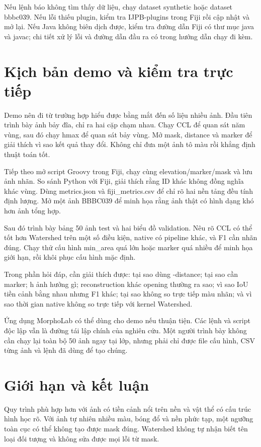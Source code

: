 \documentclass[12pt,a4paper,oneside]{report}
\begin{document}
Nếu lệnh báo không tìm thấy dữ liệu, chạy dataset synthetic hoặc dataset bbbc039. Nếu lỗi thiếu plugin, kiểm tra IJPB-plugins trong Fiji rồi cập nhật và mở lại. Nếu Java không biên dịch được, kiểm tra đường dẫn Fiji có thư mục java và javac; chi tiết xử lý lỗi và đường dẫn đầu ra có trong hướng dẫn chạy đi kèm.

\section{Kịch bản demo và kiểm tra trực tiếp}
Demo nên đi từ trường hợp hiểu được bằng mắt đến số liệu nhiều ảnh. Đầu tiên trình bày ảnh bảy đĩa, chỉ ra hai cặp chạm nhau. Chạy CCL để quan sát năm vùng, sau đó chạy hmax để quan sát bảy vùng. Mở mask, distance và marker để giải thích vì sao kết quả thay đổi. Không chỉ đưa một ảnh tô màu rồi khẳng định thuật toán tốt.

Tiếp theo mở script Groovy trong Fiji, chạy cùng elevation/marker/mask và lưu ảnh nhãn. So sánh Python với Fiji, giải thích rằng ID khác không đồng nghĩa khác vùng. Dùng metrics.json và fiji\_metrics.csv để chỉ rõ hai nền tảng đều tính định lượng. Mở một ảnh BBBC039 để minh họa rằng ảnh thật có hình dạng khó hơn ảnh tổng hợp.

Sau đó trình bày bảng 50 ảnh test và hai biểu đồ validation. Nêu rõ CCL có thể tốt hơn Watershed trên một số điều kiện, native có pipeline khác, và F1 cần nhãn đúng. Chạy thử cấu hình min\_area quá lớn hoặc marker quá nhiều để minh họa giới hạn, rồi khôi phục cấu hình mặc định.

Trong phần hỏi đáp, cần giải thích được: tại sao dùng -distance; tại sao cần marker; h ảnh hưởng gì; reconstruction khác opening thường ra sao; vì sao IoU tiền cảnh bằng nhau nhưng F1 khác; tại sao không so trực tiếp màu nhãn; và vì sao thời gian native không so trực tiếp với kernel Watershed.

Ứng dụng MorphoLab có thể dùng cho demo nếu thuận tiện. Các lệnh và script độc lập vẫn là đường tái lập chính của nghiên cứu. Một người trình bày không cần chạy lại toàn bộ 50 ảnh ngay tại lớp, nhưng phải chỉ được file cấu hình, CSV từng ảnh và lệnh đã dùng để tạo chúng.

\section{Giới hạn và kết luận}
Quy trình phù hợp hơn với ảnh có tiền cảnh nổi trên nền và vật thể có cấu trúc hình học rõ. Với ảnh tự nhiên nhiều màu, bóng đổ và nền phức tạp, một ngưỡng toàn cục có thể không tạo được mask đúng. Watershed không tự nhận biết tên loại đối tượng và không sửa được mọi lỗi từ mask.
\end{document}
